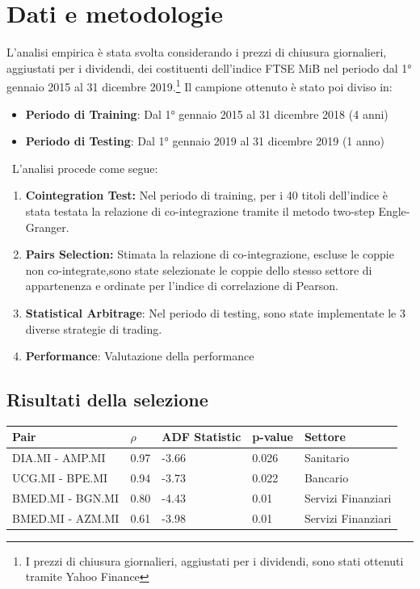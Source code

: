 \documentclass[]{article}
\begin{document}

\section{Dati e metodologie}
L'analisi empirica è stata svolta considerando i prezzi di chiusura giornalieri, aggiustati per i dividendi, dei costituenti dell'indice FTSE MiB nel periodo dal 1° gennaio 2015 al 31 dicembre 2019.\footnote{I prezzi di chiusura giornalieri, aggiustati per i dividendi, sono stati ottenuti tramite Yahoo Finance}
Il campione ottenuto è stato poi diviso in:
\begin{itemize}
	\item \textbf{Periodo di Training}: Dal 1° gennaio 2015 al 31 dicembre 2018 (4 anni)
	\item \textbf{Periodo di Testing}:  Dal 1° gennaio 2019 al 31 dicembre 2019 (1 anno)
\end{itemize}
\
L'analisi procede come segue:

\begin{enumerate}
	
	\item \textbf{Cointegration Test:} Nel periodo di training, per i 40 titoli dell'indice è stata testata la relazione di co-integrazione tramite il metodo two-step Engle-Granger.
	
	\item \textbf{Pairs Selection:} Stimata la relazione di co-integrazione, escluse le coppie non co-integrate,sono state selezionate le coppie dello stesso settore di appartenenza e ordinate per l'indice di correlazione di Pearson.
	
	\item \textbf{Statistical Arbitrage}: Nel periodo di testing, sono state implementate le 3 diverse strategie di trading.
	
	\item \textbf{Performance}: Valutazione della performance
\end{enumerate}

\subsection{Risultati della selezione}


\begin{center}
\label{sophisticatedtable}
\begin{tabular}{ p{4cm}p{1cm}p{2cm}p{1cm}p{3cm} }
	\hline
	Pair & $\rho$ & ADF Statistic & p-value & Settore\\
	\hline
	DIA.MI - AMP.MI  & 0.97  & -3.66 &  0.026 & Sanitario\\
	UCG.MI - BPE.MI & 0.94 & -3.73 & 0.022 & Bancario\\
	BMED.MI - BGN.MI & 0.80 & -4.43 & 0.01 & Servizi Finanziari \\
	BMED.MI - AZM.MI  & 0.61 & -3.98 & 0.01 & Servizi Finanziari\\
	\hline
\end{tabular}
\end{center}
\end{document}
